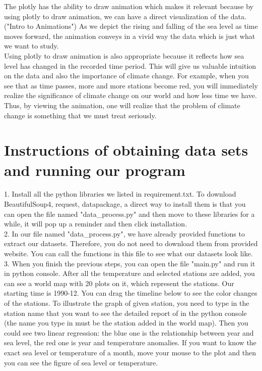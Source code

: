 \documentclass[fontsize=11pt]{article}
\begin{document}
    The plotly has the ability to draw animation which makes it relevant because by using plotly to draw animation, we can have a direct visualization of the data. ("Intro to Animations") As we depict the rising and falling of the sea level as time moves forward, the animation conveys in a vivid way the data which is just what we want to study. \\
    Using plotly to draw animation is also appropriate because it reflects how sea level has changed in the recorded time period. This will give us valuable intuition on the data and also the importance of climate change. For example, when you see that as time passes, more and more stations become red, you will immediately realize the significance of climate change on our world and how less time we have. Thus, by viewing the animation, one will realize that the problem of climate change is something that we must treat seriously.


    \section*{Instructions of obtaining data sets and running our program}

    1. Install all the python libraries we listed in requirement.txt. To download BeautifulSoup4, request, datapackage, a direct way to install them is that you can open the file named "data\_process.py" and then move to these libraries for a while, it will pop up a reminder and then click installation.\\
    2. In our file named "data\_process.py", we have already provided functions to extract our datasets. Therefore, you do not need to download them from provided website. You can call the functions in this file to see what our datasets look like. \\
    3. When you finish the previous steps, you can open the file "main.py" and run it in python console. After all the temperature and selected stations are added, you can see a world map with 20 plots on it, which represent the stations. Our starting time is 1990-12. You can drag the timeline below to see the color changes of the stations. To illustrate the graph of given station, you need to type in the station name that you want to see the detailed report of in the python console (the name you type in must be the station added in the world map). Then you could see two linear regression: the blue one is the relationship between year and sea level, the red one is year and temperature anomalies. If you want to know the exact sea level or temperature of a month, move your mouse to the plot and then you can see the figure of sea level or temperature.
\end{document}
